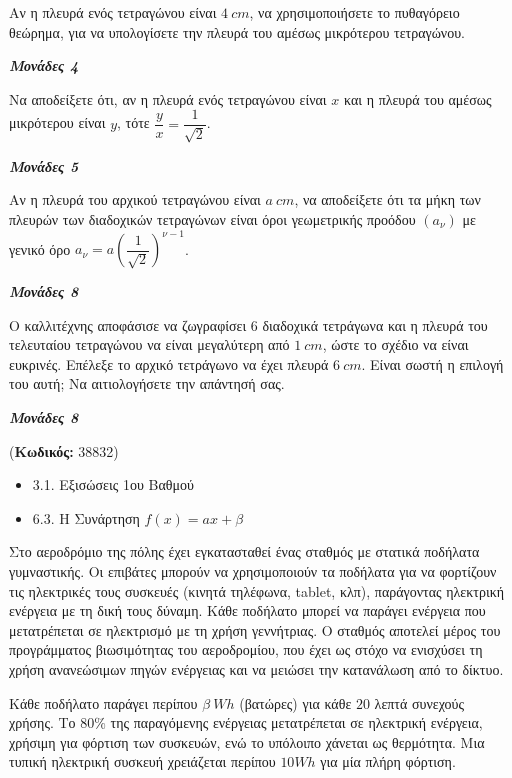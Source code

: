 \documentclass[11pt,a4paper,twoside]{book}
\newcounter{askhsh}[chapter]
\renewcommand{\theaskhsh}{
	\bf{\titlefont{\Large{\thechapter}}.\arabic{askhsh}}
}
\newcommand{\Askhsh}[2]{\refstepcounter{askhsh}{\titlefont{Άσκηση\theaskhsh} - \textcolor{maincolor}{ΘΕΜΑ #2}} ({\small{\textbf{Κωδικός:} #1}})\\}{}
\newenvironment{ylh}{
\begin{tcolorbox}[
breakable,
enhanced standard,
titlerule=0pt,
toprule=0pt, 
rightrule=0pt, 
bottomrule=0pt,
title={\titlefont Ύλη άσκησης},
colback=white,
opacityback=0,
left=2mm,
top=1mm,
bottom=0mm,
boxrule=0pt,
colframe=white,
borderline west={1.5mm}{0pt}{secondarycolor},
leftrule=2mm,
sharp corners,
coltitle=black
]
\begin{itemize}[leftmargin=3mm, itemsep=0mm, label=\textcolor{secondarycolor}{{\small\faBook}}]
}{
\end{itemize}
\end{tcolorbox}
}
\newcommand{\monades}[1]{
\hspace*{\fill}
\textbf{\textit{\textcolor{maincolor}{Μονάδες #1}}}}
\begin{document}
\begin{alist}
\item

\begin{rlist}
\item Αν η πλευρά ενός τετραγώνου είναι $4\ cm$, να χρησιμοποιήσετε το πυθαγόρειο θεώρημα, για να υπολογίσετε την πλευρά του αμέσως μικρότερου τετραγώνου.
\monades{4}
\item Να αποδείξετε ότι, αν η πλευρά ενός τετραγώνου είναι $x$ και η πλευρά του αμέσως μικρότερου είναι $y$, τότε $\dfrac{y}{x} = \dfrac{1}{\sqrt{2}}$.
\monades{5}
\end{rlist}
\item Αν η πλευρά του αρχικού τετραγώνου είναι $a\ cm$, να αποδείξετε ότι τα μήκη των πλευρών των διαδοχικών τετραγώνων είναι όροι γεωμετρικής προόδου $\left(a_{\nu}\right)$ με γενικό όρο $a_{\nu} = a \left(\dfrac{1}{\sqrt{2}}\right)^{\nu - 1}$.
\monades{8}
\item Ο καλλιτέχνης αποφάσισε να ζωγραφίσει 6 διαδοχικά τετράγωνα και η πλευρά του τελευταίου τετραγώνου να είναι μεγαλύτερη από $1\ cm$, ώστε το σχέδιο να είναι ευκρινές. Επέλεξε το αρχικό τετράγωνο να έχει πλευρά $6\ cm$. Είναι σωστή η επιλογή του αυτή; Να αιτιολογήσετε την απάντησή σας.
\monades{8}
\end{alist}

\vspace{4mm}
\Askhsh{38832}{4}
\begin{ylh}
    \item 3.1. Εξισώσεις 1ου Βαθμού
    \item 6.3. Η Συνάρτηση $f(x)=ax+\beta$
\end{ylh}

Στο αεροδρόμιο της πόλης έχει εγκατασταθεί ένας σταθμός με στατικά ποδήλατα γυμναστικής. Οι επιβάτες μπορούν να χρησιμοποιούν τα ποδήλατα για να φορτίζουν τις ηλεκτρικές τους συσκευές (κινητά τηλέφωνα, tablet, κλπ), παράγοντας ηλεκτρική ενέργεια με τη δική τους δύναμη. Κάθε ποδήλατο μπορεί να παράγει ενέργεια που μετατρέπεται σε ηλεκτρισμό με τη χρήση γεννήτριας. Ο σταθμός αποτελεί μέρος του προγράμματος βιωσιμότητας του αεροδρομίου, που έχει ως στόχο να ενισχύσει τη χρήση ανανεώσιμων πηγών ενέργειας και να μειώσει την κατανάλωση από το δίκτυο.

Κάθε ποδήλατο παράγει περίπου $\beta\ Wh$ (βατώρες) για κάθε $20$ λεπτά συνεχούς χρήσης. Το $80\%$ της παραγόμενης ενέργειας μετατρέπεται σε ηλεκτρική ενέργεια, χρήσιμη για φόρτιση των συσκευών, ενώ το υπόλοιπο χάνεται ως θερμότητα. Μια τυπική ηλεκτρική συσκευή χρειάζεται περίπου $10Wh$ για μία πλήρη φόρτιση.
\end{document}
